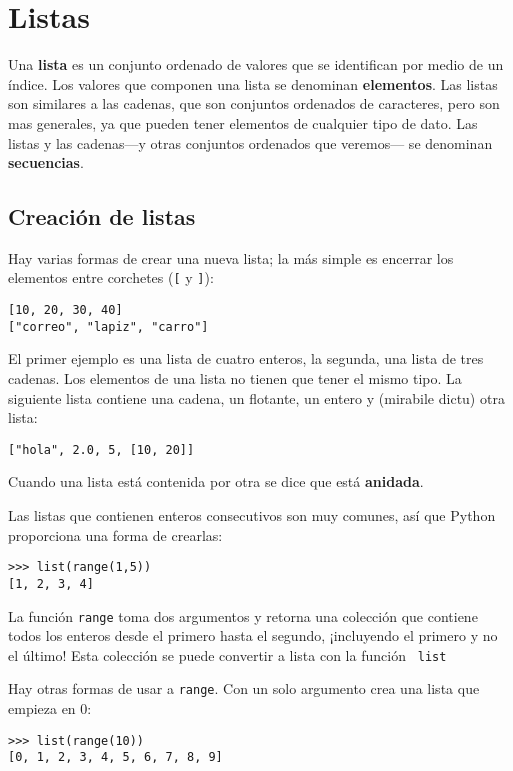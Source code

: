 
\chapter{Listas}

\label{cap:listas}   

Una \textbf{lista} es un conjunto ordenado de valores que se identifican
por medio de un índice. Los valores que componen una lista se denominan
\textbf{elementos}. Las listas son similares a las cadenas, que son
conjuntos ordenados de caracteres, pero son mas generales, ya que
pueden tener elementos de cualquier tipo de dato. Las listas y las
cadenas—y otras conjuntos ordenados que veremos— se denominan \textbf{secuencias}.

\section{Creación de listas}

Hay varias formas de crear una nueva lista; la más simple es encerrar
los elementos entre corchetes (\verb+[+ y \verb+]+):
\begin{lstlisting}
[10, 20, 30, 40]
["correo", "lapiz", "carro"]
\end{lstlisting}

El primer ejemplo es una lista de cuatro enteros, la segunda, una
lista de tres cadenas. Los elementos de una lista no tienen que tener
el mismo tipo. La siguiente lista contiene una cadena, un flotante,
un entero y (mirabile dictu) otra lista:
\begin{lstlisting}
["hola", 2.0, 5, [10, 20]]
\end{lstlisting}

Cuando una lista está contenida por otra se dice que está \textbf{anidada}.


Las listas que contienen enteros consecutivos son muy comunes, así
que Python proporciona una forma de crearlas:
\begin{lstlisting}
>>> list(range(1,5))
[1, 2, 3, 4]
\end{lstlisting}

La función \texttt{range} toma dos argumentos y retorna una colección
que contiene todos los enteros desde el primero hasta el segundo,
¡incluyendo el primero y no el último! Esta colección se puede convertir
a lista con la función  \texttt{ list }

Hay otras formas de usar a \texttt{range}. Con un solo argumento crea
una lista que empieza en 0:
\begin{lstlisting}
>>> list(range(10))
[0, 1, 2, 3, 4, 5, 6, 7, 8, 9]
\end{lstlisting}

